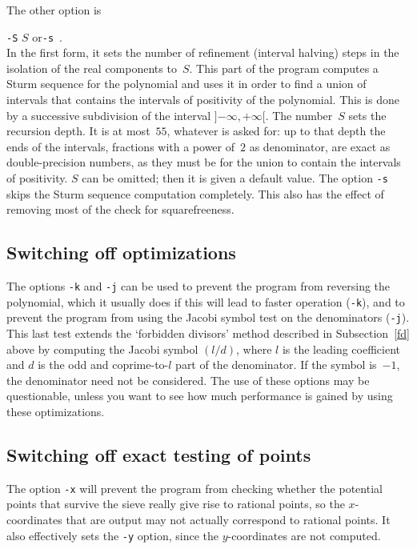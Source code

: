 \documentclass[12pt,a4paper,oneside]{amsart}
\begin{document}
The other option is \\
\strut\quad\verb+-S+ $S$ \quad or\quad \verb+-s+ \,. \\
In the first form, it sets the number of refinement (interval halving)
steps in the isolation of the real components to~$S$. This part of the
program computes a Sturm sequence for the polynomial and uses it in order
to find a union of intervals that contains the intervals of positivity
of the polynomial. This is done by a successive subdivision of the
interval $]{-\infty}, +\infty[$. The number~$S$ sets the recursion depth.
It is at most~$55$, whatever is asked for: up to that depth the ends of
the intervals, fractions with a power of~$2$ as denominator, are exact as
double-precision numbers, as they must be for the union to contain the
intervals of positivity.
$S$ can be omitted; then it is given a default value. The option
\verb+-s+ skips the Sturm sequence computation completely. This also has
the effect of removing most of the check for squarefreeness.

\subsection{Switching off optimizations}

The options \verb+-k+ and \verb+-j+ can be used to prevent the program
from reversing the polynomial, which it usually does if this will lead
to faster operation (\verb+-k+), and to prevent the program from using
the Jacobi symbol test on the denominators (\verb+-j+). This last test
extends the `forbidden divisors' method described in
Subsection~\ref{fd} above by computing the Jacobi symbol $(l/d)$, where
$l$ is the leading coefficient and $d$ is the odd and coprime-to-$l$
part of the denominator. If the symbol is~$-1$, the denominator need not
be considered. The use of these options may be questionable, unless you
want to see how much performance is gained by using these optimizations.

\subsection{Switching off exact testing of points}

The option \verb+-x+ will prevent the program from checking whether the
potential points that survive the sieve really give rise to rational
points, so the $x$-coordinates that are output may not actually correspond
to rational points. It also effectively sets the \verb+-y+ option, since the
$y$-coordinates are not computed.
\end{document}
